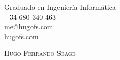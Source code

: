 \documentclass[a4paper, 12pt]{article}
\begin{document}
\pagestyle{empty} %

\begin{flushright}
    Graduado en Ingeniería Informática\\
    +34 680 340 463\\
    \href{mailto: me@hugofs.com}{me@hugofs.com}\\
    \href{https://hugofs.com}{hugofs.com}\\
\end{flushright}

\vspace{-30mm} %

\begin{figure}[ht!]
    \begin{flushleft}
    \end{flushleft}
\end{figure}

{\textsc {\Huge \vspace{3mm} \hspace{-13mm} Hugo Ferrando Seage}}\\
\end{document}
